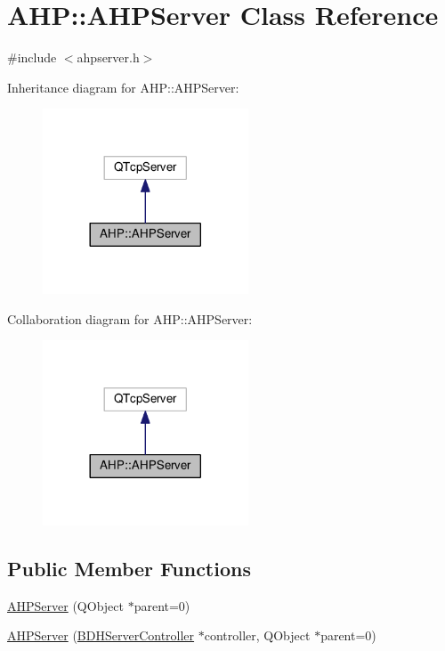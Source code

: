 \hypertarget{class_a_h_p_1_1_a_h_p_server}{}\section{A\+H\+P\+:\+:A\+H\+P\+Server Class Reference}
\label{class_a_h_p_1_1_a_h_p_server}


{\ttfamily \#include $<$ahpserver.\+h$>$}



Inheritance diagram for A\+H\+P\+:\+:A\+H\+P\+Server\+:
\nopagebreak
\begin{figure}[H]
\begin{center}
\leavevmode
\includegraphics[width=173pt]{class_a_h_p_1_1_a_h_p_server__inherit__graph}
\end{center}
\end{figure}


Collaboration diagram for A\+H\+P\+:\+:A\+H\+P\+Server\+:
\nopagebreak
\begin{figure}[H]
\begin{center}
\leavevmode
\includegraphics[width=173pt]{class_a_h_p_1_1_a_h_p_server__coll__graph}
\end{center}
\end{figure}
\subsection*{Public Member Functions}
\begin{DoxyCompactItemize}
\item 
\hyperlink{class_a_h_p_1_1_a_h_p_server_a5da515ca40886e4a67beed9be05faffe}{A\+H\+P\+Server} (Q\+Object $\ast$parent=0)
\item 
\hyperlink{class_a_h_p_1_1_a_h_p_server_ad7a2f1cce813ab6cb71b52e0a954fb1b}{A\+H\+P\+Server} (\hyperlink{class_b_d_h_server_controller}{B\+D\+H\+Server\+Controller} $\ast$controller, Q\+Object $\ast$parent=0)
\end{DoxyCompactItemize}

